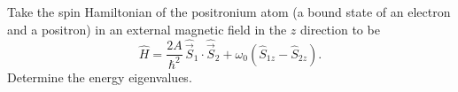 \documentclass{../phys116}
\begin{document}
\begin{solution}
  \begin{problems}
  \item
  \item
  \item
  \end{problems}
\end{solution}

\begin{exercise}
  Take the spin Hamiltonian of the positronium atom (a bound state of an electron and a positron) in an external magnetic field in the \(z\) direction to be
  \[
    \hat H = \frac{2A}{\hbar^2} \, \hat{\vec S}_1 \cdot \hat{\vec S}_2
    + \omega_0 (\hat S_{1z} - \hat S_{2z}).
  \]
  Determine the energy eigenvalues.
\end{exercise}

\begin{solution}
\end{solution}
\end{document}
